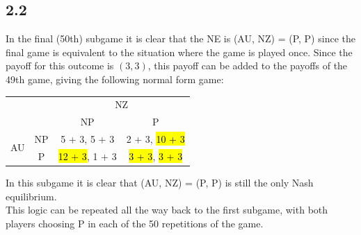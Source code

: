 \documentclass{article}
\begin{document}
\subsection*{2.2}
In the final (50th) subgame it is clear that the NE is (AU, NZ) = (P, P) since the final game is equivalent to the situation where the game is played once. Since the payoff for this outcome is $(3, 3)$, this payoff can be added to the payoffs of the 49th game, giving the following normal form game:
\begin{table}[H]
    \centering
    \begin{tabular}{@{}cccc@{}}
                                             &                         & \multicolumn{2}{c}{NZ}                                  \\ \cmidrule(l){3-4} 
                                             & \multicolumn{1}{c|}{}   & \multicolumn{1}{c|}{NP}    & \multicolumn{1}{c|}{P}     \\ \cmidrule(l){2-4} 
    \multicolumn{1}{c|}{\multirow{2}{*}{AU}} & \multicolumn{1}{c|}{NP} & \multicolumn{1}{c|}{5 + 3, 5 + 3}  & \multicolumn{1}{c|}{2 + 3, \hl{10 + 3}} \\ \cmidrule(l){2-4} 
    \multicolumn{1}{c|}{}                    & \multicolumn{1}{c|}{P}  & \multicolumn{1}{c|}{\hl{12 + 3}, 1 + 3} & \multicolumn{1}{c|}{\hl{3 + 3}, \hl{3 + 3}}  \\ \cmidrule(l){2-4} 
    \end{tabular}
\end{table}
\noindent In this subgame it is clear that (AU, NZ) = (P, P) is still the only Nash equilibrium.\\[2mm]
This logic can be repeated all the way back to the first subgame, with both players choosing P in each of the 50 repetitions of the game.
\end{document}
